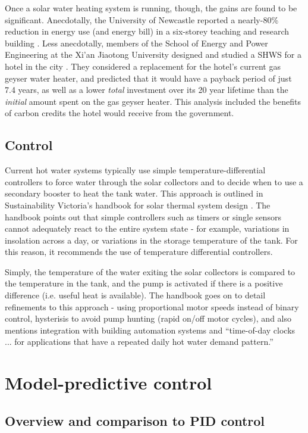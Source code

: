 Once a solar water heating system is running, though, the gains are found to be significant.
Anecdotally, the University of Newcastle reported a nearly-80\% reduction in energy use (and energy bill) in a six-storey teaching and research building \cite{ApricusNewcastle}.
Less anecdotally, members of the School of Energy and Power Engineering at the Xi'an Jiaotong University designed and studied a SHWS for a hotel in the city \cite{Cao14}.
They considered a replacement for the hotel's current gas geyser water heater, and predicted that it would have a payback period of just 7.4 years, as well as a lower {\it total} investment over its 20 year lifetime than the {\it initial} amount spent on the gas geyser heater.
This analysis included the benefits of carbon credits the hotel would receive from the government.

\subsection{Control}

Current hot water systems typically use simple temperature-differential controllers to force water through the solar collectors and to decide when to use a secondary booster to heat the tank water.
This approach is outlined in Sustainability Victoria's handbook for solar thermal system design \cite{LSTS}.
The handbook points out that simple controllers such as timers or single sensors cannot adequately react to the entire system state - for example, variations in insolation across a day, or variations in the storage temperature of the tank.
For this reason, it recommends the use of temperature differential controllers.

Simply, the temperature of the water exiting the solar collectors is compared to the temperature in the tank, and the pump is activated if there is a positive difference (i.e. useful heat is available).
The handbook goes on to detail refinements to this approach - using proportional motor speeds instead of binary control, hysterisis to avoid pump hunting (rapid on/off motor cycles), and also mentions integration with building automation systems and ``time-of-day clocks ... for applications that have a repeated daily hot water demand pattern.''

\section{Model-predictive control}

\subsection{Overview and comparison to PID control}

